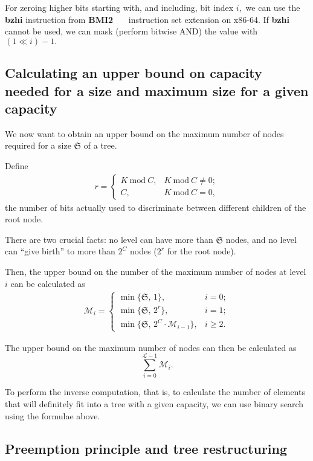 \documentclass[a4paper,12pt]{article}
\newcommand{\Mod}{\ \mathrm{mod}\ }
\begin{document}
For zeroing higher bits starting with, and including, bit index $i,$
we can use the \textbf{bzhi} instruction from \textbf{BMI2}~\cite{BMI2_a}~\cite{BMI2_b}~\cite{BMI2_c} instruction set extension on x86-64.
If \textbf{bzhi} cannot be used, we can mask (perform bitwise AND) the value with $(1 \ll i) - 1.$

\subsection{Calculating an upper bound on capacity needed for a size and maximum size for a given capacity}

We now want to obtain an upper bound on the maximum number of nodes required for a size $\mathfrak{S}$ of a tree.

Define
\begin{align*}
r = \begin{cases}
    K \Mod C, & K \Mod C \ne 0; \\
    C,        & K \Mod C = 0,
\end{cases}
\end{align*}
the number of bits actually used to discriminate between different children of the root node.

There are two crucial facts:
no level can have more than $\mathfrak{S}$ nodes,
and no level can ``give birth'' to more than $2^C$ nodes ($2^r$ for the root node).

Then, the upper bound on the number of the maximum number of nodes at level $i$
can be calculated as
\begin{align*}
\mathcal{M}_i = \begin{cases}
\min \{ \mathfrak{S}, \, 1 \}, & i = 0; \\
\min \{ \mathfrak{S}, \, 2^r \}, & i = 1; \\
\min \{ \mathfrak{S}, \, 2^C \cdot \mathcal{M}_{i - 1} \}, & i \ge 2.
\end{cases}
\end{align*}

The upper bound on the maximum number of nodes can then be calculated as
$$
\sum\limits_{i=0}^{\mathcal{L} - 1} \mathcal{M}_i.
$$

To perform the inverse computation, that is, to calculate the number of elements
that will definitely fit into a tree with a given capacity, we can use binary
search using the formulae above.

\subsection{Preemption principle and tree restructuring}
\end{document}

